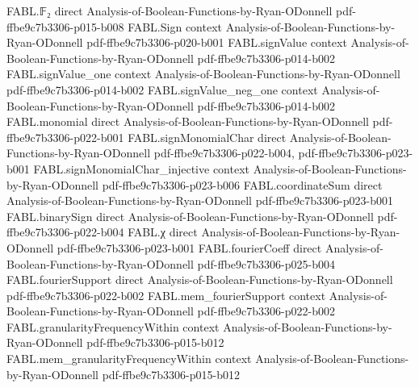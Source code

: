 \begin{theorem}
\label{FABL.expect_sq_restrictionFourierCoeff}
\leanok
{}
\proofstep
  {FABL.𝔽₂}
  {direct}
  {Analysis-of-Boolean-Functions-by-Ryan-ODonnell}
  {pdf-ffbe9c7b3306-p015-b008}
\proofstep
  {FABL.Sign}
  {context}
  {Analysis-of-Boolean-Functions-by-Ryan-ODonnell}
  {pdf-ffbe9c7b3306-p020-b001}
\proofstep
  {FABL.signValue}
  {context}
  {Analysis-of-Boolean-Functions-by-Ryan-ODonnell}
  {pdf-ffbe9c7b3306-p014-b002}
\proofstep
  {FABL.signValue_one}
  {context}
  {Analysis-of-Boolean-Functions-by-Ryan-ODonnell}
  {pdf-ffbe9c7b3306-p014-b002}
\proofstep
  {FABL.signValue_neg_one}
  {context}
  {Analysis-of-Boolean-Functions-by-Ryan-ODonnell}
  {pdf-ffbe9c7b3306-p014-b002}
\proofstep
  {FABL.monomial}
  {direct}
  {Analysis-of-Boolean-Functions-by-Ryan-ODonnell}
  {pdf-ffbe9c7b3306-p022-b001}
\proofstep
  {FABL.signMonomialChar}
  {direct}
  {Analysis-of-Boolean-Functions-by-Ryan-ODonnell}
  {pdf-ffbe9c7b3306-p022-b004,
    pdf-ffbe9c7b3306-p023-b001}
\proofstep
  {FABL.signMonomialChar_injective}
  {context}
  {Analysis-of-Boolean-Functions-by-Ryan-ODonnell}
  {pdf-ffbe9c7b3306-p023-b006}
\proofstep
  {FABL.coordinateSum}
  {direct}
  {Analysis-of-Boolean-Functions-by-Ryan-ODonnell}
  {pdf-ffbe9c7b3306-p023-b001}
\proofstep
  {FABL.binarySign}
  {direct}
  {Analysis-of-Boolean-Functions-by-Ryan-ODonnell}
  {pdf-ffbe9c7b3306-p022-b004}
\proofstep
  {FABL.χ}
  {direct}
  {Analysis-of-Boolean-Functions-by-Ryan-ODonnell}
  {pdf-ffbe9c7b3306-p023-b001}
\proofstep
  {FABL.fourierCoeff}
  {direct}
  {Analysis-of-Boolean-Functions-by-Ryan-ODonnell}
  {pdf-ffbe9c7b3306-p025-b004}
\proofstep
  {FABL.fourierSupport}
  {direct}
  {Analysis-of-Boolean-Functions-by-Ryan-ODonnell}
  {pdf-ffbe9c7b3306-p022-b002}
\proofstep
  {FABL.mem_fourierSupport}
  {context}
  {Analysis-of-Boolean-Functions-by-Ryan-ODonnell}
  {pdf-ffbe9c7b3306-p022-b002}
\proofstep
  {FABL.granularityFrequencyWithin}
  {context}
  {Analysis-of-Boolean-Functions-by-Ryan-ODonnell}
  {pdf-ffbe9c7b3306-p015-b012}
\proofstep
  {FABL.mem_granularityFrequencyWithin}
  {context}
  {Analysis-of-Boolean-Functions-by-Ryan-ODonnell}
  {pdf-ffbe9c7b3306-p015-b012}

\end{theorem}
